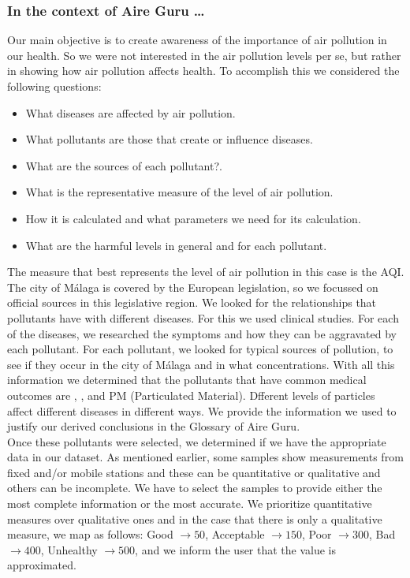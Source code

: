 \subsubsection*{In the context of Aire Guru \ldots}

Our main objective is to create awareness of the importance of air pollution in our health.
So we were not interested in the air pollution levels per se, but rather in showing how air pollution affects health.
To accomplish this we considered the following questions:

\begin{itemize}
    \item What diseases are affected by air pollution.
    \item What pollutants are those that create or influence diseases.
    \item What are the sources of each pollutant?.
    \item What is the representative measure of the level of air pollution.
    \item How it is calculated and what parameters we need for its calculation.
    \item What are the harmful levels in general and for each pollutant.
\end{itemize}

The measure that best represents the level of air pollution in this case is the AQI.
The city of Málaga is covered by the European legislation, so we focussed on official sources in this legislative region.
We looked for the relationships that pollutants have with different diseases.
For this we used clinical studies.
For each of the diseases, we researched the symptoms and how they can be aggravated by each pollutant.
For each pollutant, we looked for typical sources of pollution, to see if they occur in the city of Málaga and in what concentrations.
With all this information we determined that the pollutants that have common medical outcomes are , ,  and PM (Particulated Material).
Dfferent levels of particles affect different diseases in different ways.
We provide the information we used to justify our derived conclusions in the Glossary of Aire Guru. \\

Once these pollutants were selected, we determined if we have the appropriate data in our dataset.
As mentioned earlier, some samples show measurements from fixed and/or mobile stations and these can be quantitative or qualitative and others can be incomplete.
We have to select the samples to provide either the most complete information or the most accurate.
We prioritize quantitative measures over qualitative ones and in the case that there is only a qualitative measure, we map as follows:
Good $\rightarrow 50$, Acceptable $\rightarrow 150$, Poor $\rightarrow 300$, Bad $\rightarrow 400$, Unhealthy $\rightarrow 500$,
and we inform the user that the value is approximated.\\

